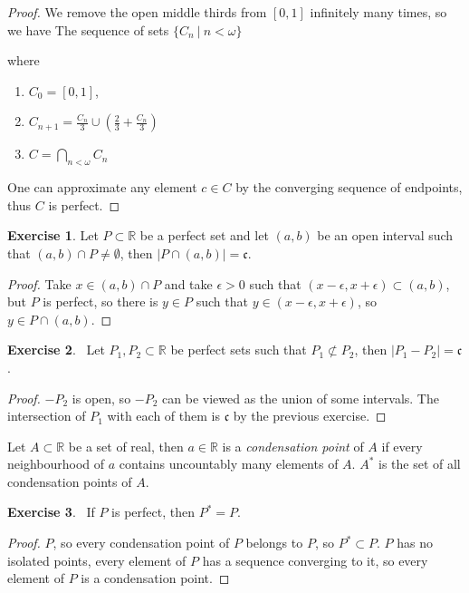 \documentclass[8pt]{article}
\theoremstyle{definition}
\theoremstyle{definition}
\theoremstyle{definition}
\theoremstyle{definition}
\theoremstyle{definition}
\theoremstyle{definition}
\theoremstyle{definition}
\theoremstyle{definition}
\theoremstyle{definition}
\theoremstyle{definition}
\theoremstyle{definition}
\theoremstyle{definition}
\theoremstyle{definition}
\newtheorem{exercise}{Exercise}[section]
\theoremstyle{definition}
\theoremstyle{question}
\begin{document}
\begin{proof}
  We remove the open middle thirds from $[0, 1]$ infinitely many times, so we have
  The sequence of sets $\{ C_n \: | \: n < \omega \}$

  where
  \begin{enumerate}
    \item $C_0 = [0, 1]$,
    \item $C_{n + 1} = \frac{C_{n}}{3} \cup (\frac{2}{3} + \frac{C_{n}}{3})$
    \item $C = \bigcap \limits_{n < \omega} C_n$
  \end{enumerate}
  One can approximate any element $c \in C$ by the converging sequence of endpoints, thus $C$ is perfect.
\end{proof}

\begin{exercise}
  Let $P \subset \mathbb{R}$ be a perfect set and let $(a, b)$ be an open interval such that 
  $(a, b) \cap P \neq \emptyset$, then $|P \cap (a, b)| = \mathfrak{c}$.
\end{exercise}

\begin{proof}
  Take $x \in (a, b) \cap P$ and take $\epsilon > 0$ such that $(x - \epsilon, x + \epsilon) \subset (a, b)$,
  but $P$ is perfect, so there is $y \in P$ such that $y \in (x - \epsilon, x + \epsilon)$, 
  so $y \in P \cap (a, b)$.
\end{proof}

\begin{exercise}~\label{uncountable:diff}
  Let $P_1, P_2 \subset \mathbb{R}$ be perfect sets such that $P_1 \not\subset P_2$, then $|P_1 - P_2| = \mathfrak{c}$.
\end{exercise}
\begin{proof}
$- P_2$ is open, so $- P_2$ can be viewed as the union of some intervals. The intersection of $P_1$ with each of them is $\mathfrak{c}$ by
the previous exercise.
\end{proof}

Let $A \subset \mathbb{R}$ be a set of real, then $a \in \mathbb{R}$ is a \emph{condensation point} of $A$
if every neighbourhood of $a$ contains uncountably many elements of $A$. $A^*$ is the set of all condensation points of $A$.

\begin{exercise}~\label{perf:cons}
  If $P$ is perfect, then $P^* = P$.
\end{exercise}

\begin{proof}
   $P$, so every condensation point of $P$ belongs to $P$, so
   $P^* \subset P$. $P$ has no isolated points, every element of $P$
   has a sequence converging to it, so every element of $P$ is a condensation point.
\end{proof}
\end{document}
